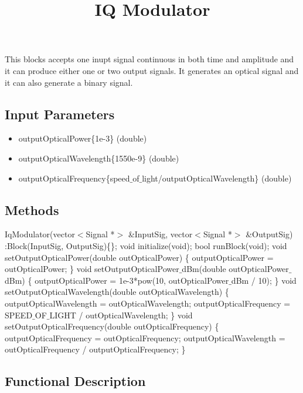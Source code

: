 \documentclass[a4paper]{article}
\title{IQ Modulator}
\begin{document}
\maketitle

This blocks accepts one inupt signal continuous in both time and amplitude and it can produce either one or two output signals. It generates an optical signal and it can also generate a binary signal. 

\subsection*{Input Parameters}

\begin{itemize}
	\item outputOpticalPower\{1e-3\} \linebreak
	(double)
	\item outputOpticalWavelength\{1550e-9\} \linebreak (double)
	\item outputOpticalFrequency\{speed$\_$of$\_$light/outputOpticalWavelength\} \linebreak
	(double)
\end{itemize}

\subsection*{Methods}

IqModulator(vector$<$Signal *$>$ \&InputSig, vector$<$Signal *$>$ \&OutputSig) :Block(InputSig, OutputSig)\{\};
\bigbreak
void initialize(void);
\bigbreak
bool runBlock(void);
\bigbreak
void setOutputOpticalPower(double outOpticalPower) \{ outputOpticalPower = outOpticalPower; \}
\bigbreak
void setOutputOpticalPower$\_$dBm(double outOpticalPower$\_$dBm) \{ outputOpticalPower = 1e-3*pow(10, outOpticalPower$\_$dBm / 10); \}
\bigbreak
void setOutputOpticalWavelength(double outOpticalWavelength) \{ outputOpticalWavelength = outOpticalWavelength; outputOpticalFrequency = SPEED$\_$OF$\_$LIGHT / outOpticalWavelength; \}
\bigbreak
void setOutputOpticalFrequency(double outOpticalFrequency) \{ outputOpticalFrequency = outOpticalFrequency; outputOpticalWavelength = outOpticalFrequency / outputOpticalFrequency; \}

\subsection*{Functional Description}
\end{document}
